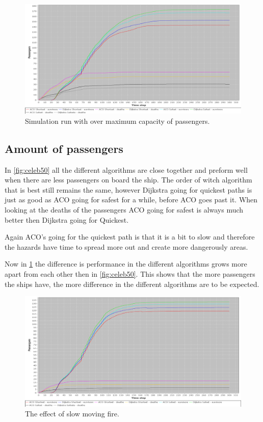 \begin{figure} [h]
\centering
\hspace*{-1.0in}
\includegraphics[scale=0.35]{images/Graph-using-200-rounds-200-passangers.png}
\caption{Simulation run with over maximum capacity of passengers.}
\label{fig:celeb200}
\end{figure}

\subsection{Amount of passengers}

In \ref{fig:celeb50} all the different algorithms are close together and preform well when there are less passengers on board the ship. The order of witch algorithm that is best still remains the same, however Dijkstra going for quickest paths is just as good as ACO going for safest for a while, before ACO goes past it. When looking at the deaths of the passengers ACO going for safest is always much better then Dijkstra going for Quickest.

Again ACO's going for the quickest path is that it is a bit to slow and therefore the hazards have time to spread more out and create more dangerously areas.

Now in \ref{fig:celeb200} the difference is performance in the different algorithms grows more apart from each other then in \ref{fig:celeb50}. This shows that the more passengers the ships have, the more difference in the different algorithms are to be expected.

\begin{figure} [h]
\centering
\hspace*{-1.0in}
\includegraphics[scale=0.35]{images/Graph-using-200-rounds-140-passangers-slow-fire.png}
\caption{The effect of slow moving fire.}
\label{fig:celebSfire}
\end{figure}

